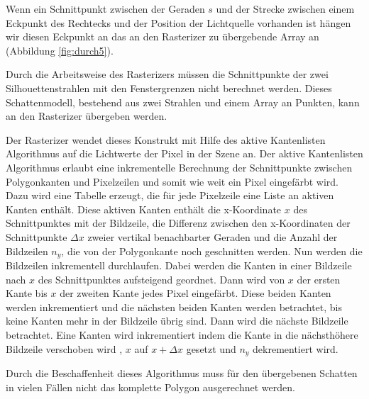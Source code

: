 Wenn ein Schnittpunkt zwischen der Geraden $s$ und der Strecke zwischen einem Eckpunkt des Rechtecks und der Position der Lichtquelle vorhanden ist hängen wir diesen Eckpunkt an das an den Rasterizer zu übergebende Array an (Abbildung \ref{fig:durch5}).

Durch die Arbeitsweise des Rasterizers müssen die Schnittpunkte der zwei Silhouettenstrahlen mit den Fenstergrenzen nicht berechnet werden. Dieses Schattenmodell, bestehend aus zwei Strahlen und einem Array an Punkten, kann an den Rasterizer übergeben werden.

Der Rasterizer wendet dieses Konstrukt mit Hilfe des aktive Kantenlisten Algorithmus auf die Lichtwerte der Pixel in der Szene an. Der aktive Kantenlisten Algorithmus erlaubt eine inkrementelle Berechnung der Schnittpunkte zwischen Polygonkanten und Pixelzeilen und somit wie weit ein Pixel eingefärbt wird. Dazu wird eine Tabelle erzeugt, die für jede Pixelzeile eine Liste an aktiven Kanten enthält. Diese aktiven Kanten enthält die x-Koordinate $x$ des Schnittpunktes mit der Bildzeile, die Differenz zwischen den x-Koordinaten der Schnittpunkte $\Delta x$ zweier vertikal benachbarter Geraden und die Anzahl der Bildzeilen $n_y$, die von der Polygonkante noch geschnitten werden. Nun werden die Bildzeilen inkrementell durchlaufen. Dabei werden die Kanten in einer Bildzeile nach $x$ des Schnittpunktes aufsteigend geordnet. Dann wird von $x$ der ersten Kante bis $x$ der zweiten Kante jedes Pixel eingefärbt. Diese beiden Kanten werden inkrementiert und die nächsten beiden Kanten werden betrachtet, bis keine Kanten mehr in der Bildzeile übrig sind. Dann wird die nächste Bildzeile betrachtet. Eine Kanten wird inkrementiert indem die Kante in die nächsthöhere Bildzeile verschoben wird , $x$ auf $x + \Delta x$ gesetzt und $n_y$ dekrementiert wird.

Durch die Beschaffenheit dieses Algorithmus muss für den übergebenen Schatten in vielen Fällen nicht das komplette Polygon ausgerechnet werden.
